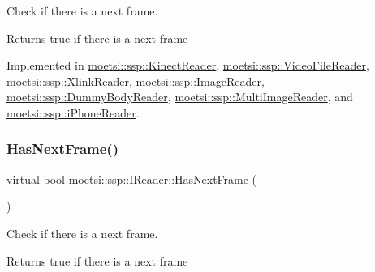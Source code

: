 Check if there is a next frame. 

\begin{DoxyReturn}{Returns}
true if there is a next frame 
\end{DoxyReturn}


Implemented in \hyperlink{classmoetsi_1_1ssp_1_1KinectReader_a08934b6eff437142e482bb21780ca171}{moetsi\+::ssp\+::\+Kinect\+Reader}, \hyperlink{classmoetsi_1_1ssp_1_1VideoFileReader_ab5733b56b6d6dd7596eac9d914481c7e}{moetsi\+::ssp\+::\+Video\+File\+Reader}, \hyperlink{classmoetsi_1_1ssp_1_1XlinkReader_ab57ff571372fbbe18f4f5f96e4bc7c21}{moetsi\+::ssp\+::\+Xlink\+Reader}, \hyperlink{classmoetsi_1_1ssp_1_1ImageReader_ad8e87720ca0ec97de501f1070119b28d}{moetsi\+::ssp\+::\+Image\+Reader}, \hyperlink{classmoetsi_1_1ssp_1_1DummyBodyReader_ab91b3c2ccdba21bae040340c34361595}{moetsi\+::ssp\+::\+Dummy\+Body\+Reader}, \hyperlink{classmoetsi_1_1ssp_1_1MultiImageReader_a04240c98d28d8949fca4ecdcb04f04f5}{moetsi\+::ssp\+::\+Multi\+Image\+Reader}, and \hyperlink{classmoetsi_1_1ssp_1_1iPhoneReader_a35ca55a03a9fb7b559f9381b11f53bfe}{moetsi\+::ssp\+::i\+Phone\+Reader}.

\mbox{\label{classmoetsi_1_1ssp_1_1IReader_af9186ba41e136dc4ec3242b5dd55fa04}} 
\subsubsection{\texorpdfstring{Has\+Next\+Frame()}{HasNextFrame()}\hspace{0.1cm}{\footnotesize\ttfamily [2/2]}}
{\footnotesize\ttfamily virtual bool moetsi\+::ssp\+::\+I\+Reader\+::\+Has\+Next\+Frame (\begin{DoxyParamCaption}{ }\end{DoxyParamCaption})\hspace{0.3cm}{\ttfamily [pure virtual]}}



Check if there is a next frame. 

\begin{DoxyReturn}{Returns}
true if there is a next frame 
\end{DoxyReturn}


